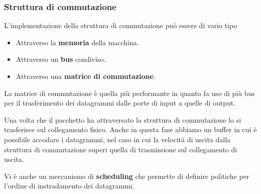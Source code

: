 \subsubsection{Struttura di commutazione}
L'implementazione della struttura di commutazione può essere di vario
tipo
\begin{itemize}
	\item Attraverso la \textbf{memoria} della macchina.
	\item Attraverso un \textbf{bus} condiviso.
	\item Attraverso una \textbf{matrice di commutazione}.
\end{itemize}
La matrice di commutazione è quella più performante in quanto fa uso
di più bus per il trasferimento dei datagrammi dalle porte di input a
quelle di output.

Una volta che il pacchetto ha attraversato la struttura di commutazione
lo si trasferisce sul collegamento fisico. Anche in questa fase abbiamo
un buffer in cui è possibile accodare i datagrammi, nel caso in cui 
la velocità di uscita dalla struttura di commutazione superi quella 
di trasmissione sul collegamento di uscita.

Vi è anche un meccanismo di \textbf{scheduling} che permette di 
definire politiche per l'ordine di instradamento dei datagrammi.
